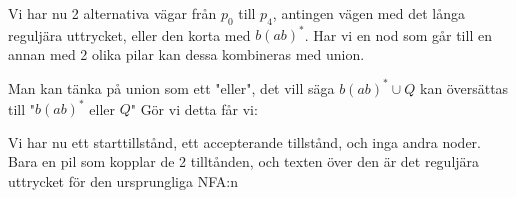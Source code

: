 \noindent Vi har nu 2 alternativa vägar från $p_0$ till $p_4$, antingen vägen med det långa reguljära uttrycket, eller den korta med $b(ab)^*$. Har vi en nod som går till en annan med 2 olika pilar kan dessa kombineras med union.\par
\noindent Man kan tänka på union som ett "eller", det vill säga $b(ab)^*\cup Q$ kan översättas till "$b(ab)^*$ eller $Q$"
\newpage
\noindent Gör vi detta får vi:
\begin{figure}[ht!]
    \centering
    \caption{}
\end{figure}\par
\noindent Vi har nu ett starttillstånd, ett accepterande tillstånd, och inga andra noder. Bara en pil som kopplar de 2 tilltånden, och texten över den är det reguljära uttrycket för den ursprungliga NFA:n 
